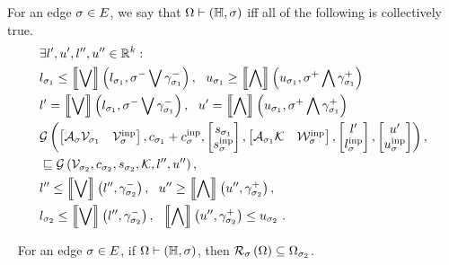 \begin{definition}
For an edge $\sigma\in E$, we say that $\Omega\vdash\left(\mathbb{H},\sigma\right)$
iff all of the following is collectively true.
%
\begin{align}
& \exists l^\prime,u^\prime,l^{\prime\prime},u^{\prime\prime}\in\mathbb{R}^k:\nonumber\\
& l_{\sigma_1}\leq \left\llbracket\bigvee\right\rrbracket\left(l_{\sigma_1},\sigma^-\bigvee \gamma_{\sigma_1}^-\right),~~
u_{\sigma_1}\geq\left\llbracket\bigwedge\right\rrbracket\left(u_{\sigma_1},\sigma^+\bigwedge \gamma_{\sigma_1}^+\right)~\label{eqn:disinv1}\\
&
l^\prime=\left\llbracket\bigvee\right\rrbracket\left(l_{\sigma_1},\sigma^-\bigvee \gamma_{\sigma_1}^-\right),~~
u^\prime=\left\llbracket\bigwedge\right\rrbracket\left(u_{\sigma_1},\sigma^+\bigwedge \gamma_{\sigma_1}^+\right)~\label{eqn:disinv2}\\
& \mathcal{G}\left(
\left[\begin{matrix}\mathcal{A}_{\sigma}\mathcal{V}_{\sigma_1} & \mathcal{V}^{\operatorname{inp}}_{\sigma}\end{matrix}\right]
,
c_{\sigma_1}+c^{\operatorname{inp}}_{\sigma}
,
\left[\begin{matrix}s_{\sigma_1}\\ s^{\operatorname{inp}}_{\sigma}\end{matrix}\right]
,
\left[\begin{matrix}\mathcal{A}_{\sigma_1}\mathcal{K} & \mathcal{W}^{\operatorname{inp}}_{\sigma}\end{matrix}\right]
,
\left[\begin{matrix}l^\prime\\l^{\operatorname{inp}}_{\sigma}\end{matrix}\right]
,
\left[\begin{matrix}u^\prime\\ u^{\operatorname{inp}}_{\sigma}\end{matrix}\right]
\right),\nonumber\\
& \sqsubseteq 
\mathcal{G}\left(\mathcal{V}_{\sigma_2},c_{\sigma_2},s_{\sigma_2},\mathcal{K},l^{\prime\prime},u^{\prime\prime}\right),~\label{eqn:disinv3}\\
&
l^{\prime\prime}\leq\left\llbracket\bigvee\right\rrbracket\left(l^{\prime\prime},\gamma_{\sigma_2}^-\right),~~u^{\prime\prime}\geq\left\llbracket\bigwedge\right\rrbracket\left(u^{\prime\prime},\gamma_{\sigma_2}^+\right),~\label{eqn:disinv4}\\
& l_{\sigma_2}\leq\left\llbracket\bigvee\right\rrbracket\left(l^{\prime\prime},\gamma_{\sigma_2}^-\right),~~\left\llbracket\bigwedge\right\rrbracket\left(u^{\prime\prime},\gamma_{\sigma_2}^+\right)\leq u_{\sigma_2}~\label{eqn:disinv5}.
\end{align}
%
\end{definition}
%
\begin{lemma}~\label{lem:pi-dis}
For an edge $\sigma\in E$, if $\Omega\vdash\left(\mathbb{H},\sigma\right)$, then $\mathcal{R}_{\sigma}\left(\Omega\right)\subseteq\Omega_{\sigma_2}$.
\end{lemma}
%
